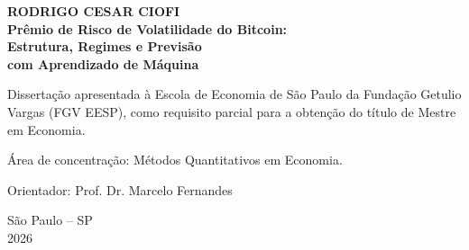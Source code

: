 
\begin{titlepage}
\begin{center}

{\Large \textbf{RODRIGO CESAR CIOFI}}\\[3cm]

{\Large \textbf{Prêmio de Risco de Volatilidade do Bitcoin:\\
Estrutura, Regimes e Previsão\\
com Aprendizado de Máquina}}\\[3.5cm]

\end{center}

\noindent
Dissertação apresentada à Escola de Economia de São Paulo da Fundação Getulio
Vargas (FGV EESP), como requisito parcial para a obtenção do título de Mestre
em Economia.

\vspace{0.7cm}

\noindent
Área de concentração: Métodos Quantitativos em Economia.

\vspace{0.7cm}

\noindent
Orientador: Prof. Dr. Marcelo Fernandes

\vfill

\begin{center}
São Paulo -- SP\\
2026
\end{center}

\end{titlepage}
